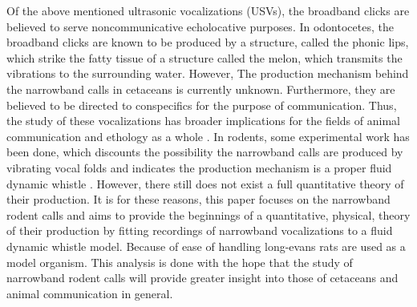 \documentclass[twocolumn, prl]{revtex4}
\begin{document}
Of the above mentioned ultrasonic vocalizations (USVs), the broadband clicks are believed to serve noncommunicative echolocative purposes. In odontocetes, the broadband clicks are known to be produced by a structure, called the phonic lips, which strike the fatty tissue of a structure called the melon, which transmits the vibrations to the surrounding water. However, The production mechanism behind the narrowband calls in cetaceans is currently unknown. Furthermore, they are believed to be directed to conspecifics for the purpose of communication. Thus, the study of these vocalizations has broader implications for the fields of animal communication and ethology as a whole \cite{Reidenberg2010}. In rodents, some experimental work has been done, which discounts the possibility the narrowband calls are produced by vibrating vocal folds and indicates the production mechanism is a proper fluid dynamic whistle \cite{Riede2011,Riede2011a,Roberts1975}. However, there still does not exist a full quantitative theory of their production. It is for these reasons, this paper focuses on the narrowband rodent calls and aims to provide the beginnings of a quantitative, physical, theory of their production by fitting recordings of narrowband vocalizations to a fluid dynamic whistle model. Because of ease of handling long-evans rats are used as a model organism. This analysis is done with the hope that the study of narrowband rodent calls will provide greater insight into those of cetaceans and animal communication in general.
\end{document}

